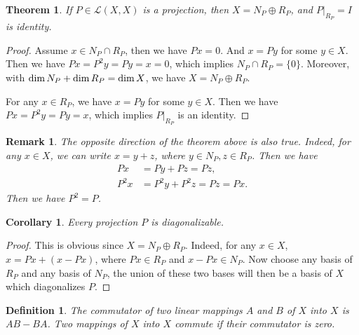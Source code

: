 \documentclass[10pt]{book}
\newtheorem{definition}{Definition}[chapter]
\newtheorem{theorem}{Theorem}[chapter]
\newtheorem{corollary}{Corollary}[theorem]
\newtheorem{remark}{Remark}[chapter]
\theoremstyle{definition}
\numberwithin{equation}{chapter}
\begin{document}
\begin{theorem}\label{projection_direct_sum}
If $P\in\mathscr{L}(X,X)$ is a projection, then $X = N_P\oplus R_P$, and $P|_{R_P} = I$ is identity.
\end{theorem}
\begin{proof}
Assume $x\in N_P\cap R_P$, then we have $Px = 0$. And $x = P y$ for some $y\in X$. Then we have $Px = P^2 y = P y = x = 0$, which implies $N_P\cap R_P = \{0\}$. Moreover, with ${\rm dim}\, N_P + {\rm dim}\, R_P = {\rm dim}\, X$, we have $X = N_P\oplus R_P$.

For any $x\in R_P$, we have $x = P y$ for some $y\in X$. Then we have $Px = P^2 y = Py = x$, which implies $P|_{R_P}$ is an identity.
\end{proof}
\begin{remark}
The opposite direction of the theorem above is also true. Indeed, for any $x\in X$, we can write $x = y+z$, where $y\in N_P, z\in R_P$. Then we have
\begin{align*}
    Px & = Py + Pz = Pz, \\
    P^2 x & = P^2 y + P^2 z = Pz = Px.
\end{align*}
Then we have $P^2=P$.
\end{remark}

\medskip

\begin{corollary}
Every projection $P$ is diagonalizable.
\end{corollary}
\begin{proof}
This is obvious since $X = N_P\oplus R_P$. Indeed, for any $x \in X$, $x = Px + (x - Px)$, where $Px \in R_P$ and $x - Px \in N_P$. Now choose any basis of $R_P$ and any basis of $N_P$, the union of these two bases will then be a basis of $X$ which diagonalizes $P$.
\end{proof}

\medskip

\begin{definition}
The commutator of two linear mappings $A$ and $B$ of $X$ into $X$ is $AB - BA$. Two mappings of $X$ into $X$ commute if their commutator is zero.
\end{definition}


\medskip
\end{document}
